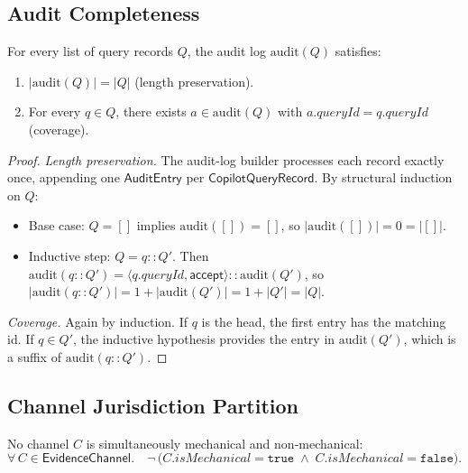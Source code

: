 \documentclass[11pt]{article}
\newcommand{\EvCh}{\mathsf{EvidenceChannel}}
\newcommand{\QRec}{\mathsf{CopilotQueryRecord}}
\newcommand{\audit}{\mathrm{audit}}
\begin{document}
\subsection{Audit Completeness}
\label{sec:formal:audit}

\begin{theorem}
\label{thm:audit}
For every list of query records $Q$, the audit log
$\audit(Q)$ satisfies:
\begin{enumerate}
\item $|\audit(Q)| = |Q|$ \quad (length preservation).
\item For every $q \in Q$, there exists $a \in \audit(Q)$
  with $a.\mathit{queryId} = q.\mathit{queryId}$
  \quad (coverage).
\end{enumerate}
\end{theorem}

\begin{proof}
\emph{Length preservation.}
The audit-log builder processes each record exactly once,
appending one $\mathsf{AuditEntry}$ per $\QRec$.  By
structural induction on $Q$:
\begin{itemize}
\item Base case: $Q = []$ implies $\audit([]) = []$, so
  $|\audit([])| = 0 = |[]|$.
\item Inductive step: $Q = q :: Q'$.  Then
  $\audit(q :: Q') = \langle q.\mathit{queryId},
  \mathsf{accept}\rangle :: \audit(Q')$, so
  $|\audit(q::Q')| = 1 + |\audit(Q')| = 1 + |Q'| = |Q|$.
\end{itemize}

\emph{Coverage.}
Again by induction.  If $q$ is the head, the first entry
has the matching id.  If $q \in Q'$, the inductive hypothesis
provides the entry in $\audit(Q')$, which is a suffix of
$\audit(q::Q')$.
\end{proof}

\subsection{Channel Jurisdiction Partition}
\label{sec:formal:partition}

\begin{proposition}
\label{prop:disjoint}
No channel $C$ is simultaneously mechanical and non-mechanical:
\[
  \forall\, C \in \EvCh.\quad
  \neg\,\bigl(C.\mathit{isMechanical} = \texttt{true}
  \;\wedge\; C.\mathit{isMechanical} = \texttt{false}\bigr).
\]
\end{proposition}
\end{document}
